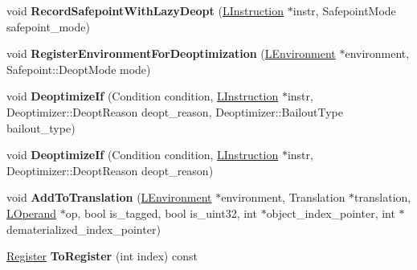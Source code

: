 \begin{DoxyCompactItemize}
\item 
void {\bfseries Record\+Safepoint\+With\+Lazy\+Deopt} (\hyperlink{classv8_1_1internal_1_1_l_instruction}{L\+Instruction} $\ast$instr, Safepoint\+Mode safepoint\+\_\+mode)\hypertarget{classv8_1_1internal_1_1_l_code_gen_ae96e1ea2617dfdd8a23b554d85bdd250}{}\label{classv8_1_1internal_1_1_l_code_gen_ae96e1ea2617dfdd8a23b554d85bdd250}

\item 
void {\bfseries Register\+Environment\+For\+Deoptimization} (\hyperlink{classv8_1_1internal_1_1_l_environment}{L\+Environment} $\ast$environment, Safepoint\+::\+Deopt\+Mode mode)\hypertarget{classv8_1_1internal_1_1_l_code_gen_a8e3566b9bf7194223c47e7dac6fd6a10}{}\label{classv8_1_1internal_1_1_l_code_gen_a8e3566b9bf7194223c47e7dac6fd6a10}

\item 
void {\bfseries Deoptimize\+If} (Condition condition, \hyperlink{classv8_1_1internal_1_1_l_instruction}{L\+Instruction} $\ast$instr, Deoptimizer\+::\+Deopt\+Reason deopt\+\_\+reason, Deoptimizer\+::\+Bailout\+Type bailout\+\_\+type)\hypertarget{classv8_1_1internal_1_1_l_code_gen_a1bb540ee7e5a30ae0181c3cbcb50f96c}{}\label{classv8_1_1internal_1_1_l_code_gen_a1bb540ee7e5a30ae0181c3cbcb50f96c}

\item 
void {\bfseries Deoptimize\+If} (Condition condition, \hyperlink{classv8_1_1internal_1_1_l_instruction}{L\+Instruction} $\ast$instr, Deoptimizer\+::\+Deopt\+Reason deopt\+\_\+reason)\hypertarget{classv8_1_1internal_1_1_l_code_gen_a916240582a4a52fea20a57b60be8ba5c}{}\label{classv8_1_1internal_1_1_l_code_gen_a916240582a4a52fea20a57b60be8ba5c}

\item 
void {\bfseries Add\+To\+Translation} (\hyperlink{classv8_1_1internal_1_1_l_environment}{L\+Environment} $\ast$environment, Translation $\ast$translation, \hyperlink{classv8_1_1internal_1_1_l_operand}{L\+Operand} $\ast$op, bool is\+\_\+tagged, bool is\+\_\+uint32, int $\ast$object\+\_\+index\+\_\+pointer, int $\ast$dematerialized\+\_\+index\+\_\+pointer)\hypertarget{classv8_1_1internal_1_1_l_code_gen_a418f466c19b6671a29663f4378a36d8c}{}\label{classv8_1_1internal_1_1_l_code_gen_a418f466c19b6671a29663f4378a36d8c}

\item 
\hyperlink{structv8_1_1internal_1_1_register}{Register} {\bfseries To\+Register} (int index) const \hypertarget{classv8_1_1internal_1_1_l_code_gen_ae4d98c4f4146a2d8ea844342a5bae0ea}{}\label{classv8_1_1internal_1_1_l_code_gen_ae4d98c4f4146a2d8ea844342a5bae0ea}


\end{DoxyCompactItemize}
